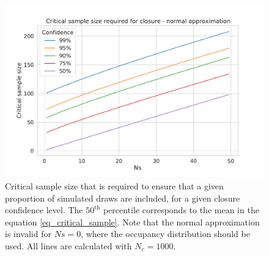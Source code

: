\documentclass[review]{elsarticle}
\begin{document}


\begin{figure}
  \centering
  \includegraphics[width=\textwidth]{fig/critical_normal.pdf}
  \caption{Critical sample size that is required to ensure that a given proportion of simulated
  draws are included, for a given closure confidence level. The
    $50^\text{th}$ percentile corresponds to the mean in the equation \eqref{eq_critical_sample}. Note that the
    normal approximation is invalid for $Ns=0$, where the occupancy distribution should be used. All
    lines are calculated with $N_e=1000$.}
  \label{fig_apx_critical_normal}
\end{figure}
\end{document}
